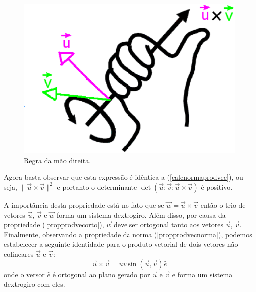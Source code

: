 \begin{figure}%
     \includegraphics[width=\textwidth]{./cap_algvet/figs/R_mao_dir.eps}
      \caption{Regra da mão direita. }
  \end{figure}


Agora basta observar que esta expressão é idêntica a (\ref{calcnormaprodvec}), ou seja, $\|\vec{u}\times\vec{v}\|^2$ e portanto o determinante $\det\left(\vec{u};\vec{v};\vec{u}\times\vec{v}\right)$ é positivo. 

A importância desta propriedade está no fato que se $\vec{w}=\vec{u}\times \vec{v}$ então o trio de vetores $\vec{u}$, $\vec{v}$ e $\vec{w}$ forma um sistema dextrogiro. Além disso, por causa da propriedade (\ref{propprodvecorto}), $\vec{w}$ deve ser ortogonal tanto aos vetores $\vec{u}$, $\vec{v}$. Finalmente, observando a propriedade da norma (\ref{propprodvecnorma}), podemos estabelecer a seguinte identidade para o produto vetorial de dois vetores não colineares $\vec{u}$ e $\vec{v}$:
\begin{equation}
\vec{u}\times\vec{v}=uv\sin\left(\vec{u},\vec{v}\right)\hat{e}
\end{equation}
onde o versor $\hat{e}$ é ortogonal ao plano gerado por $\vec{u}$ e $\vec{v}$ e forma um sistema dextrogiro com eles.  

